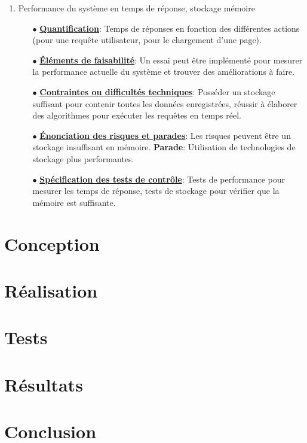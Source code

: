 \documentclass[a4paper]{book}
\begin{document}
\begin{enumerate}
\item Performance du système en temps de réponse, stockage mémoire

\begin{itemize}
    \item[$\bullet$] \textbf{\underline{Quantification}}: Temps de réponses en fonction des différentes actions (pour une requête utilisateur, pour le chargement d'une page).
    \item[$\bullet$] \textbf{\underline{Éléments de faisabilité}}: Un essai peut être implémenté pour mesurer la performance actuelle du système et trouver des améliorations à faire.
    \item[$\bullet$] \textbf{\underline{Contraintes ou difficultés techniques}}: Posséder un stockage suffisant pour contenir toutes les données enregistrées, réussir à élaborer des algorithmes pour exécuter les requêtes en temps réel.
    \item[$\bullet$] \textbf{\underline{Énonciation des risques et parades}}:  Les risques peuvent être un stockage insuffisant en mémoire.\newline
    \textbf{Parade}: Utilisation de technologies de stockage plus performantes.
    \item[$\bullet$] \textbf{\underline{Spécification des tests de contrôle}}: Tests de performance pour mesurer les temps de réponse, tests de stockage pour vérifier que la mémoire est suffisante.
\end{itemize} 

\end{enumerate}

\chapter{Conception}
\chapter{Réalisation}
\chapter{Tests}
\chapter{Résultats}
\chapter{Conclusion}
\end{document}
